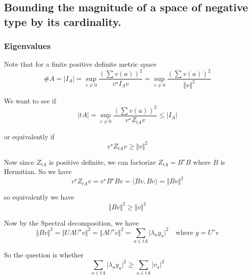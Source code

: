 \documentclass[11pt]{article}
\theoremstyle{definition}
\theoremstyle{definition}
\theoremstyle{plain}
\theoremstyle{plain}
\theoremstyle{plain}
\theoremstyle{definition}
\begin{document}
\subsection*{Bounding the magnitude of a space of negative type by its cardinality.}

\subsubsection*{Eigenvalues}

Note that for a finite positive definite metric space
\begin{equation*}
\#A = \vert I_A \vert = \sup\limits_{v \neq 0}\frac{\left(\sum v(a)\right)^2}{v^\star I_A v} = \sup\limits_{v\neq0}\frac{\left(\sum v(a)\right)^2}{\Vert v \Vert^2}
\end{equation*}

We want to see if
\begin{equation*}
\vert tA \vert = \sup\limits_{v\neq0}\frac{\left(\sum v(a)\right)^2}{v^\star Z_{tA}v}\leq \vert I_A \vert
\end{equation*}

or equivalently if
\begin{equation*}
v^\star Z_{tA} v \geq \Vert v \Vert^2
\end{equation*}

Now since $Z_{tA}$ is positive definite, we can factorize $Z_{tA} = B^\star B$ where $B$ is Hermitian. So we have
\begin{equation*}
v^\star Z_{tA} v = v^\star B^\star B v = \langle Bv, Bv \rangle = \Vert Bv \Vert^2
\end{equation*}

so equivalently we have
\begin{equation*}
\Vert Bv \Vert^2 \geq \Vert v \Vert^2
\end{equation*}

Now by the Spectral decomposition, we have
\begin{equation*}
\Vert Bv \Vert^2 = \Vert U \Lambda U^\star v \Vert^2 = \Vert \Lambda U^\star v \Vert^2 = \sum\limits_{a \in tA} \vert \lambda_a y_a \vert^2 \quad \text{where $y = U^\star v$}
\end{equation*}

So the question is whether
\begin{equation*}
\sum\limits_{a\in tA} \vert \lambda_a y_a \vert^2 \geq \sum\limits_{a \in tA} \vert v_a \vert^2
\end{equation*}
\end{document}
